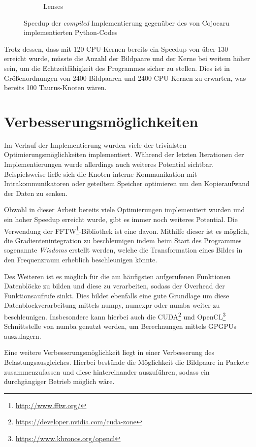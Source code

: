 \begin{center}
\begin{figure}[htbp]
\begin{subfigure}[b]{0.45\textwidth}
			\caption{Lenses}
			\label{fig:best_speedup_lenses}
		\end{subfigure}
		\caption{Speedup der \textit{compiled} Implementierung gegenüber des von Cojocaru implementierten Python-Codes}
		\label{fig:best_speedup}
	\end{figure}
\end{center}

Trotz dessen, dass mit 120 \gls{CPU}-Kernen bereits ein Speedup von über 130 erreicht wurde, müsste die Anzahl der Bildpaare und der Kerne bei weitem höher sein, um die Echtzeitfähigkeit des Programmes sicher zu stellen. Dies ist in Größenordnungen von 2400 Bildpaaren und 2400 \gls{CPU}-Kernen zu erwarten, was bereits 100 Taurus-Knoten wären. 

\section{Verbesserungsmöglichkeiten}

Im Verlauf der Implementierung wurden viele der trivialsten Optimierungsmöglichkeiten implementiert. Während der letzten Iterationen der Implementierungen wurde allerdings auch weiteres Potential sichtbar. Beispielsweise ließe sich die Knoten interne Kommunikation mit Intrakommunikatoren oder geteiltem Speicher optimieren um den Kopieraufwand der Daten zu senken. 

Obwohl in dieser Arbeit bereits viele Optimierungen implementiert wurden und ein hoher Speedup erreicht wurde, gibt es immer noch weiteres Potential. Die Verwendung der FFTW\footnote{\url{http://www.fftw.org/}}-Bibliothek ist eine davon. Mithilfe dieser ist es möglich, die Gradientenintegration zu beschleunigen indem beim Start des Programmes sogenannte \textit{Wisdoms} erstellt werden, welche die Transformation eines Bildes in den Frequenzraum erheblich beschleunigen könnte. 

Des Weiteren ist es möglich für die am häufigsten aufgerufenen Funktionen Datenblöcke zu bilden und diese zu verarbeiten, sodass der Overhead der Funktionsaufrufe sinkt. Dies bildet ebenfalls eine gute Grundlage um diese Datenblockverarbeitung mittels numpy, numexpr oder numba weiter zu beschleunigen. Insbesondere kann hierbei auch die CUDA\footnote{\url{https://developer.nvidia.com/cuda-zone}} und OpenCL\footnote{\url{https://www.khronos.org/opencl}} Schnittstelle von numba genutzt werden, um Berechnungen mittels \glspl{GPGPU} auszulagern. 

Eine weitere Verbesserungsmöglichkeit liegt in einer Verbesserung des Belastungsausgleiches. Hierbei bestünde die Möglichkeit die Bildpaare in Packete zusammenzufassen und diese hintereinander auszuführen, sodass ein durchgängiger Betrieb möglich wäre. 

